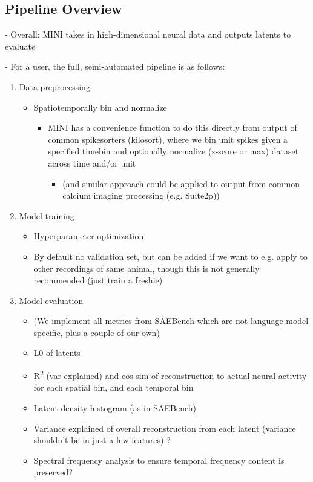 \subsection{Pipeline Overview}

- Overall: MINI takes in high-dimensional neural data and outputs latents to evaluate

- For a user, the full, semi-automated pipeline is as follows:
\begin{enumerate}
    \item Data preprocessing
    \begin{itemize}
        \item Spatiotemporally bin and normalize
        \begin{itemize}
            \item MINI has a convenience function to do this directly from output of common spikesorters (kilosort), where we bin unit spikes given a specified timebin and optionally normalize (z-score or max) dataset across time and/or unit
            \begin{itemize}
                \item (and similar approach could be applied to output from common calcium imaging processing (e.g. Suite2p))
            \end{itemize}
        \end{itemize}
    \end{itemize}
    
    \item Model training
    \begin{itemize}
        \item Hyperparameter optimization
        \item By default no validation set, but can be added if we want to e.g. apply to other recordings of same animal, though this is not generally recommended (just train a freshie)
    \end{itemize}
    
    \item Model evaluation
    \begin{itemize}
        \item (We implement all metrics from SAEBench which are not language-model specific, plus a couple of our own)
        \item L0 of latents
        \item R\textsuperscript{2} (var explained) and cos sim of reconstruction-to-actual neural activity for each spatial bin, and each temporal bin
        \item Latent density histogram (as in SAEBench)
        \item Variance explained of overall reconstruction from each latent (variance shouldn't be in just a few features) ?
        \item Spectral frequency analysis to ensure temporal frequency content is preserved?
    \end{itemize}
    

\end{enumerate}
